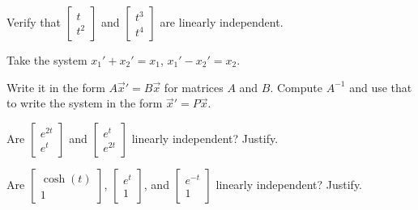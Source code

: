 \begin{exercise}
Verify that
$\left[ \begin{smallmatrix}
t \\ t^2
\end{smallmatrix} \right]$ and
$\left[ \begin{smallmatrix}
t^3 \\ t^4
\end{smallmatrix} \right]$ 
are linearly independent.
\end{exercise}

\begin{exercise}
Take the system $x_1' + x_2' = x_1$,
$x_1' - x_2' = x_2$.
\begin{tasks}
\task Write it in the form
$A {\vec{x}}' = B \vec{x}$ for matrices $A$ and $B$.
\task Compute $A^{-1}$ and use that to write the system in the form
${\vec{x}}' = P \vec{x}$.
\end{tasks}
\end{exercise}

\setcounter{exercise}{100}

\begin{exercise}
Are
$\left[ \begin{smallmatrix}
e^{2t} \\ e^t
\end{smallmatrix}\right]$
and
$\left[ \begin{smallmatrix}
e^{t} \\ e^{2t}
\end{smallmatrix}\right]$
linearly independent?  Justify.
\end{exercise}

\begin{exercise}
Are
$\left[ \begin{smallmatrix}
\cosh(t) \\ 1
\end{smallmatrix}\right]$,
$\left[ \begin{smallmatrix}
e^{t} \\ 1
\end{smallmatrix}\right]$,
and
$\left[ \begin{smallmatrix}
e^{-t} \\ 1
\end{smallmatrix}\right]$
linearly independent?  Justify.
\end{exercise}

